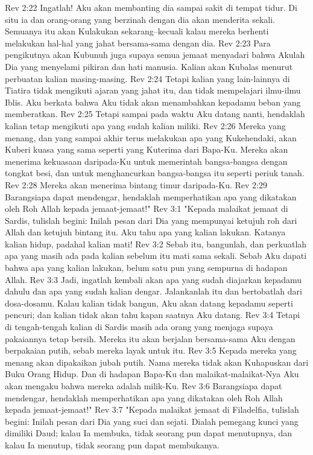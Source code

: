 Rev 2:22  Ingatlah! Aku akan membanting dia sampai sakit di tempat tidur. Di situ ia dan orang-orang yang berzinah dengan dia akan menderita sekali. Semuanya itu akan Kulakukan sekarang--kecuali kalau mereka berhenti melakukan hal-hal yang jahat bersama-sama dengan dia.
Rev 2:23  Para pengikutnya akan Kubunuh juga supaya semua jemaat menyadari bahwa Akulah Dia yang menyelami pikiran dan hati manusia. Kalian akan Kubalas menurut perbuatan kalian masing-masing.
Rev 2:24  Tetapi kalian yang lain-lainnya di Tiatira tidak mengikuti ajaran yang jahat itu, dan tidak mempelajari ilmu-ilmu Iblis. Aku berkata bahwa Aku tidak akan menambahkan kepadamu beban yang memberatkan.
Rev 2:25  Tetapi sampai pada waktu Aku datang nanti, hendaklah kalian tetap mengikuti apa yang sudah kalian miliki.
Rev 2:26  Mereka yang menang, dan yang sampai akhir terus melakukan apa yang Kukehendaki, akan Kuberi kuasa yang sama seperti yang Kuterima dari Bapa-Ku. Mereka akan menerima kekuasaan daripada-Ku untuk memerintah bangsa-bangsa dengan tongkat besi, dan untuk menghancurkan bangsa-bangsa itu seperti periuk tanah.
Rev 2:28  Mereka akan menerima bintang timur daripada-Ku.
Rev 2:29  Barangsiapa dapat mendengar, hendaklah memperhatikan apa yang dikatakan oleh Roh Allah kepada jemaat-jemaat!"
Rev 3:1  "Kepada malaikat jemaat di Sardis, tulislah begini: Inilah pesan dari Dia yang mempunyai ketujuh roh dari Allah dan ketujuh bintang itu. Aku tahu apa yang kalian lakukan. Katanya kalian hidup, padahal kalian mati!
Rev 3:2  Sebab itu, bangunlah, dan perkuatlah apa yang masih ada pada kalian sebelum itu mati sama sekali. Sebab Aku dapati bahwa apa yang kalian lakukan, belum satu pun yang sempurna di hadapan Allah.
Rev 3:3  Jadi, ingatlah kembali akan apa yang sudah diajarkan kepadamu dahulu dan apa yang sudah kalian dengar. Jalankanlah itu dan bertobatlah dari dosa-dosamu. Kalau kalian tidak bangun, Aku akan datang kepadamu seperti pencuri; dan kalian tidak akan tahu kapan saatnya Aku datang.
Rev 3:4  Tetapi di tengah-tengah kalian di Sardis masih ada orang yang menjaga supaya pakaiannya tetap bersih. Mereka itu akan berjalan bersama-sama Aku dengan berpakaian putih, sebab mereka layak untuk itu.
Rev 3:5  Kepada mereka yang menang akan dipakaikan jubah putih. Nama mereka tidak akan Kuhapuskan dari Buku Orang Hidup. Dan di hadapan Bapa-Ku dan malaikat-malaikat-Nya Aku akan mengaku bahwa mereka adalah milik-Ku.
Rev 3:6  Barangsiapa dapat mendengar, hendaklah memperhatikan apa yang dikatakan oleh Roh Allah kepada jemaat-jemaat!"
Rev 3:7  "Kepada malaikat jemaat di Filadelfia, tulislah begini: Inilah pesan dari Dia yang suci dan sejati. Dialah pemegang kunci yang dimiliki Daud; kalau Ia membuka, tidak seorang pun dapat menutupnya, dan kalau Ia menutup, tidak seorang pun dapat membukanya.
